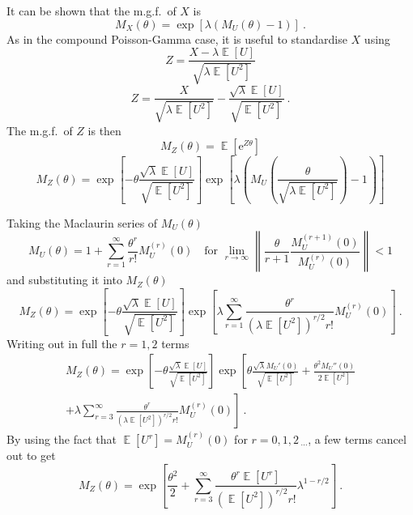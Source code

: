 \documentclass[12pt, a4paper]{memoir}
\DeclareMathOperator{\expectation}{\mathbb{E}}
\newcommand{\euler}{\mathrm{e}}
\newcommand{\dotdotdot}{_{\phantom{.}\cdots}}
\begin{document}
It can be shown that the m.g.f.~of $X$ is
\begin{equation}
M_X(\theta)=\exp\left[
\lambda(M_U(\theta)-1)
\right] \ .
\end{equation}
As in the compound Poisson-Gamma case, it is useful to standardise $X$ using
\begin{equation*}
Z = \frac{X-\lambda\expectation[U]}{\sqrt{\lambda\expectation[U^2]}}
\end{equation*}
\begin{equation}
Z = \frac{X}{\sqrt{\lambda\expectation[U^2]}}
-\frac{\sqrt{\lambda}\expectation[U]}{\sqrt{\expectation[U^2]}} \ .
\end{equation}
The m.g.f.~of $Z$ is then
\begin{equation*}
M_Z(\theta)=\expectation\left[\euler^{Z\theta}\right]
\end{equation*}
\begin{equation*}
M_Z(\theta)=\exp\left[-\theta\frac{\sqrt{\lambda}\expectation[U]}{\sqrt{\expectation[U^2]}}\right]
\exp\left[
\lambda\left(
M_U\left(\frac{\theta}{\sqrt{\lambda\expectation[U^2]}}\right)-1
\right)
\right]
\end{equation*}

Taking the Maclaurin series of $M_U(\theta)$
\begin{equation}
M_U(\theta) = 1 + \sum_{r=1}^\infty\frac{\theta^r}{r!}M_U^{(r)}(0)
\quad\text{for }\lim_{r\rightarrow\infty}
\left\|
\frac{\theta}{r+1}\frac{M_U^{(r+1)}(0)}{M_U^{(r)}(0)}
\right\|<1
\end{equation}
and substituting it into $M_Z(\theta)$
\begin{equation*}
M_Z(\theta)=\exp\left[-\theta\frac{\sqrt{\lambda}\expectation[U]}{\sqrt{\expectation[U^2]}}\right]
\exp\left[
\lambda\sum_{r=1}^\infty\frac{\theta^r}{(\lambda\expectation[U^2])^{r/2}r!}M_U^{(r)}(0)
\right] \ .
\end{equation*}
Writing out in full the $r=1,2$ terms
\begin{multline*}
M_Z(\theta)=\exp\left[-\theta\frac{\sqrt{\lambda}\expectation[U]}{\sqrt{\expectation[U^2]}}\right]
\exp\left[
\theta\frac{\sqrt{\lambda}M_U'(0)}{\sqrt{\expectation[U^2]}}
+
\frac{\theta^2M_U''(0)}{2\expectation[U^2]}
\right.\\+\left.
\lambda\sum_{r=3}^\infty\frac{\theta^r}{(\lambda\expectation[U^2])^{r/2}r!}M_U^{(r)}(0)
\right] \ .
\end{multline*}
By using the fact that $\expectation[U^r]=M_U^{(r)}(0)$ for $r=0,1,2\dotdotdot$, a few terms cancel out to get
\begin{equation}
M_Z(\theta)=\exp\left[
\frac{\theta^2}{2}
+
\sum_{r=3}^\infty\frac{\theta^r \expectation[U^r]}{(\expectation[U^2])^{r/2}r!}\lambda^{1-r/2}
\right] \ .
\end{equation}
\end{document}
